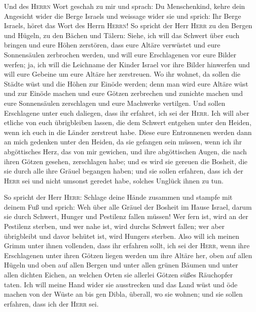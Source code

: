 Und des \textsc{Herrn} Wort geschah zu mir und sprach:
 Du Menschenkind, kehre dein Angesicht wider die Berge
Israels und weissage wider sie  und sprich: Ihr Berge
Israels, höret das Wort des Herrn \textsc{Herrn}! So spricht der Herr
\textsc{Herr} zu den Bergen und Hügeln, zu den Bächen und Tälern: Siehe,
ich will das Schwert über euch bringen und eure Höhen zerstören,
 dass eure Altäre verwüstet und eure Sonnensäulen
zerbrochen werden, und will eure Erschlagenen vor eure Bilder werfen;
 ja, ich will die Leichname der Kinder Israel vor ihre
Bilder hinwerfen und will eure Gebeine um eure Altäre her zerstreuen.
 Wo ihr wohnet, da sollen die Städte wüst und die Höhen
zur Einöde werden; denn man wird eure Altäre wüst und zur Einöde machen
und eure Götzen zerbrechen und zunichte machen und eure Sonnensäulen
zerschlagen und eure Machwerke vertilgen.  Und sollen
Erschlagene unter euch daliegen, dass ihr erfahret, ich sei der
\textsc{Herr}.  Ich will aber etliche von euch
übrigbleiben lassen, die dem Schwert entgehen unter den Heiden, wenn ich
euch in die Länder zerstreut habe.  Diese eure Entronnenen
werden dann an mich gedenken unter den Heiden, da sie gefangen sein
müssen, wenn ich ihr abgöttisches Herz, das von mir gewichen, und ihre
abgöttischen Augen, die nach ihren Götzen gesehen, zerschlagen habe; und
es wird sie gereuen die Bosheit, die sie durch alle ihre Gräuel begangen
haben;  und sie sollen erfahren, dass ich der
\textsc{Herr} sei und nicht umsonst geredet habe, solches Unglück ihnen
zu tun.

 So spricht der Herr \textsc{Herr}: Schlage deine Hände
zusammen und stampfe mit deinem Fuß und sprich: Weh über alle Gräuel der
Bosheit im Hause Israel, darum sie durch Schwert, Hunger und Pestilenz
fallen müssen!  Wer fern ist, wird an der Pestilenz
sterben, und wer nahe ist, wird durchs Schwert fallen; wer aber
übrigbleibt und davor behütet ist, wird Hungers sterben. Also will ich
meinen Grimm unter ihnen vollenden,  dass ihr erfahren
sollt, ich sei der \textsc{Herr}, wenn ihre Erschlagenen unter ihren
Götzen liegen werden um ihre Altäre her, oben auf allen Hügeln und oben
auf allen Bergen und unter allen grünen Bäumen und unter allen dichten
Eichen, an welchen Orten sie allerlei Götzen süßes Räuchopfer taten.
 Ich will meine Hand wider sie ausstrecken und das Land
wüst und öde machen von der Wüste an bis gen Dibla, überall, wo sie
wohnen; und sie sollen erfahren, dass ich der \textsc{Herr} sei.

